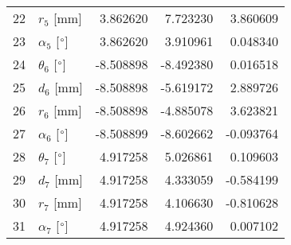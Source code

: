 \documentclass{standalone}%
\begin{document}
\begin{tabular}{llrrr}
22 &              $r_{5}$ [mm] &  3.862620 &   7.723230 &   3.860609 \\
23 &  $\alpha_{5}$ [$\degree$] &  3.862620 &   3.910961 &   0.048340 \\
24 &  $\theta_{6}$ [$\degree$] & -8.508898 &  -8.492380 &   0.016518 \\
25 &              $d_{6}$ [mm] & -8.508898 &  -5.619172 &   2.889726 \\
26 &              $r_{6}$ [mm] & -8.508898 &  -4.885078 &   3.623821 \\
27 &  $\alpha_{6}$ [$\degree$] & -8.508899 &  -8.602662 &  -0.093764 \\
28 &  $\theta_{7}$ [$\degree$] &  4.917258 &   5.026861 &   0.109603 \\
29 &              $d_{7}$ [mm] &  4.917258 &   4.333059 &  -0.584199 \\
30 &              $r_{7}$ [mm] &  4.917258 &   4.106630 &  -0.810628 \\
31 &  $\alpha_{7}$ [$\degree$] &  4.917258 &   4.924360 &   0.007102 \\
\bottomrule
\end{tabular}
%
\end{document}
